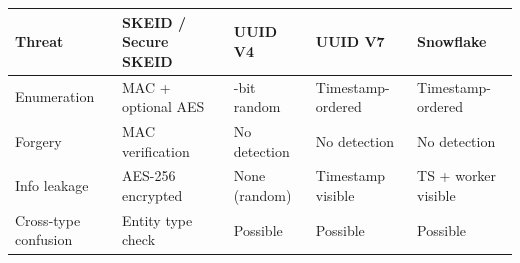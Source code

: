 \documentclass[fleqn,10pt,lineno]{wlpeerj}
\begin{document}
{\def\LTcaptype{none} %
\begin{longtable}[]{@{}
  >{\raggedright\arraybackslash}p{}
  >{\raggedright\arraybackslash}p{}
  >{\raggedright\arraybackslash}p{}
  >{\raggedright\arraybackslash}p{}
  >{\raggedright\arraybackslash}p{}@{}}
\toprule\noalign{}
\begin{minipage}[b]{\linewidth}\raggedright
Threat
\end{minipage} & \begin{minipage}[b]{\linewidth}\raggedright
SKEID / Secure SKEID
\end{minipage} & \begin{minipage}[b]{\linewidth}\raggedright
UUID V4
\end{minipage} & \begin{minipage}[b]{\linewidth}\raggedright
UUID V7
\end{minipage} & \begin{minipage}[b]{\linewidth}\raggedright
Snowflake
\end{minipage} \\
\midrule\noalign{}
\endhead
\bottomrule\noalign{}
\endlastfoot
Enumeration & MAC + optional AES & 122-bit random & Timestamp-ordered &
Timestamp-ordered \\
Forgery & MAC verification & No detection & No detection & No
detection \\
Info leakage & AES-256 encrypted & None (random) & Timestamp visible &
TS + worker visible \\
Cross-type confusion & Entity type check & Possible & Possible &
Possible \\
\end{longtable}
}
\end{document}
